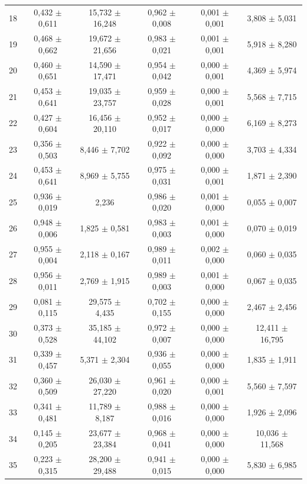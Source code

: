 \begin{tabular}{l c c c c c}
18 & 0,432 $\pm$ 0,611 & 15,732 $\pm$ 16,248 & 0,962 $\pm$ 0,008 & 0,001 $\pm$ 0,001 & 3,808 $\pm$ 5,031 \\
19 & 0,468 $\pm$ 0,662 & 19,672 $\pm$ 21,656 & 0,983 $\pm$ 0,021 & 0,001 $\pm$ 0,001 & 5,918 $\pm$ 8,280 \\
20 & 0,460 $\pm$ 0,651 & 14,590 $\pm$ 17,471 & 0,954 $\pm$ 0,042 & 0,000 $\pm$ 0,001 & 4,369 $\pm$ 5,974 \\
21 & 0,453 $\pm$ 0,641 & 19,035 $\pm$ 23,757 & 0,959 $\pm$ 0,028 & 0,000 $\pm$ 0,001 & 5,568 $\pm$ 7,715 \\
22 & 0,427 $\pm$ 0,604 & 16,456 $\pm$ 20,110 & 0,952 $\pm$ 0,017 & 0,000 $\pm$ 0,000 & 6,169 $\pm$ 8,273 \\
23 & 0,356 $\pm$ 0,503 & 8,446 $\pm$ 7,702 & 0,922 $\pm$ 0,092 & 0,000 $\pm$ 0,000 & 3,703 $\pm$ 4,334 \\
24 & 0,453 $\pm$ 0,641 & 8,969 $\pm$ 5,755 & 0,975 $\pm$ 0,031 & 0,000 $\pm$ 0,001 & 1,871 $\pm$ 2,390 \\
25 & 0,936 $\pm$ 0,019 & 2,236 & 0,986 $\pm$ 0,020 & 0,001 $\pm$ 0,000 & 0,055 $\pm$ 0,007 \\
26 & 0,948 $\pm$ 0,006 & 1,825 $\pm$ 0,581 & 0,983 $\pm$ 0,003 & 0,001 $\pm$ 0,000 & 0,070 $\pm$ 0,019 \\
27 & 0,955 $\pm$ 0,004 & 2,118 $\pm$ 0,167 & 0,989 $\pm$ 0,011 & 0,002 $\pm$ 0,000 & 0,060 $\pm$ 0,035 \\
28 & 0,956 $\pm$ 0,011 & 2,769 $\pm$ 1,915 & 0,989 $\pm$ 0,003 & 0,001 $\pm$ 0,000 & 0,067 $\pm$ 0,035 \\
29 & 0,081 $\pm$ 0,115 & 29,575 $\pm$ 4,435 & 0,702 $\pm$ 0,155 & 0,000 $\pm$ 0,000 & 2,467 $\pm$ 2,456 \\
30 & 0,373 $\pm$ 0,528 & 35,185 $\pm$ 44,102 & 0,972 $\pm$ 0,007 & 0,000 $\pm$ 0,000 & 12,411 $\pm$ 16,795 \\
31 & 0,339 $\pm$ 0,457 & 5,371 $\pm$ 2,304 & 0,936 $\pm$ 0,055 & 0,000 $\pm$ 0,000 & 1,835 $\pm$ 1,911 \\
32 & 0,360 $\pm$ 0,509 & 26,030 $\pm$ 27,220 & 0,961 $\pm$ 0,020 & 0,000 $\pm$ 0,001 & 5,560 $\pm$ 7,597 \\
33 & 0,341 $\pm$ 0,481 & 11,789 $\pm$ 8,187 & 0,988 $\pm$ 0,016 & 0,000 $\pm$ 0,000 & 1,926 $\pm$ 2,096 \\
34 & 0,145 $\pm$ 0,205 & 23,677 $\pm$ 23,384 & 0,968 $\pm$ 0,041 & 0,000 $\pm$ 0,000 & 10,036 $\pm$ 11,568 \\
35 & 0,223 $\pm$ 0,315 & 28,200 $\pm$ 29,488 & 0,941 $\pm$ 0,015 & 0,000 $\pm$ 0,000 & 5,830 $\pm$ 6,985 \\

\end{tabular}

